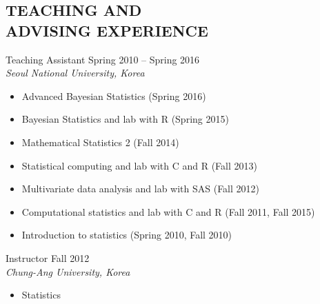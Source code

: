 \documentclass[margin, 10pt]{res} %
\begin{document}
\begin{resume}
 
\section{\sf TEACHING AND\\ ADVISING EXPERIENCE}

Teaching Assistant \hfill Spring 2010 -- Spring 2016  \\
{\sl Seoul National University, Korea}
\begin{itemize} \itemsep -2pt %
	\item Advanced Bayesian Statistics (Spring 2016)
	\item Bayesian Statistics and lab with R (Spring 2015)
	\item Mathematical Statistics 2 (Fall 2014)
	\item Statistical computing and lab with C and R (Fall 2013)
	\item Multivariate data analysis and lab with SAS (Fall 2012)
	\item Computational statistics and lab with C and R (Fall 2011, Fall 2015)
	\item Introduction to statistics (Spring 2010, Fall 2010)
\end{itemize} 

Instructor \hfill Fall 2012 \\
{\sl Chung-Ang University, Korea}
\begin{itemize}\itemsep -2pt %
	\item Statistics
\end{itemize}

\vspace{.2cm}


%
 


\end{resume}
\end{document}
